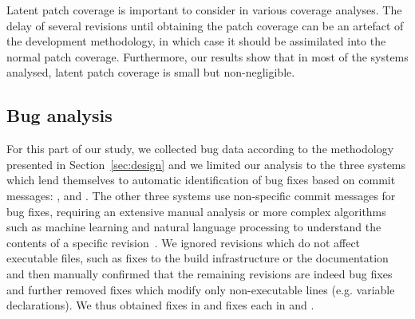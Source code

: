 Latent patch coverage is important to consider in various coverage
analyses. The delay of several revisions until obtaining the patch
coverage can be an artefact of the development methodology, in which
case it should be assimilated into the normal patch coverage. Furthermore,
our results show that in most of the systems analysed, latent patch
coverage is small but non-negligible.

\subsection{Bug analysis}
\label{sec:bugs}



For this part of our study, we collected bug data according to the
methodology presented in Section~\ref{sec:design} and we limited our
analysis to the three systems which lend themselves to automatic
identification of bug fixes based on commit messages:
\memcached, \redis and \zeromq.  The other three systems
use non-specific commit messages for bug fixes, requiring an extensive
manual analysis or more complex algorithms such as machine learning
and natural language processing to understand the contents of a
specific revision~\cite{categorization:esem10}.  We ignored revisions
which do not affect executable files, such as fixes to the build
infrastructure or the documentation and then manually confirmed
that the remaining revisions are indeed bug
fixes~\cite{bug-feature:icse13} and further removed fixes which modify
only non-executable lines (e.g. variable declarations). We thus
obtained \memcachedFixes fixes in \memcached and \redisFixes fixes each in \redis
and \zeromq. %

